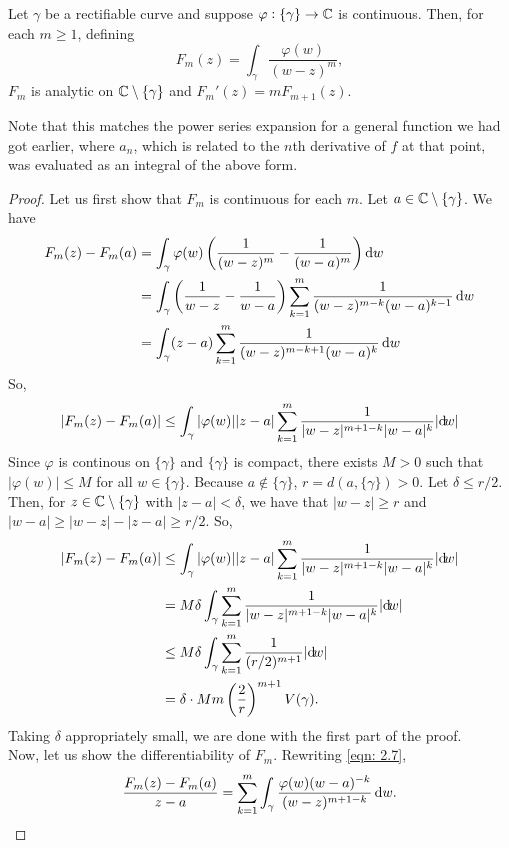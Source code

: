 	\begin{flem}
		\label{lemma 2.31: Fm}
		Let $\gamma$ be a rectifiable curve and suppose $\varphi : \{\gamma\} \to \mathbb{C}$ is continuous. Then, for each $m \ge 1$, defining
		\[ F_m(z) = \int_\gamma \frac{\varphi(w)}{(w-z)^m}, \]
		$F_m$ is analytic on $\mathbb{C}\setminus\{\gamma\}$ and $F_m'(z) = m F_{m+1}(z)$.
	\end{flem}
	Note that this matches the power series expansion for a general function we had got earlier, where $a_n$, which is related to the $n$th derivative of $f$ at that point, was evaluated as an integral of the above form.
	\begin{proof}
		Let us first show that $F_m$ is continuous for each $m$. Let $a \in \mathbb{C}\setminus\{\gamma\}$. We have
		\begin{align}
			F_m(z) - F_m(a) &= \int_\gamma \varphi(w) \left( \frac{1}{(w-z)^m} - \frac{1}{(w-a)^m} \right) \dif w \nonumber \\
				&= \int_\gamma \left( \frac{1}{w-z} - \frac{1}{w-a} \right) \sum_{k=1}^{m} \frac{1}{(w-z)^{m-k} (w-a)^{k-1}} \dif w \nonumber \\
				&= \int_\gamma (z-a) \sum_{k=1}^{m} \frac{1}{(w-z)^{m-k+1} (w-a)^{k}} \dif w \label{eqn: 2.7}
		\end{align}
		So,
		\[ |F_m(z) - F_m(a)| \le \int_\gamma |\varphi(w)| |z-a| \sum_{k=1}^m \frac{1}{|w-z|^{m+1-k}|w-a|^{k}} |{\dif} {w}| \]
		Since $\varphi$ is continous on $\{\gamma\}$ and $\{\gamma\}$ is compact, there exists $M > 0$ such that $|\varphi(w)| \le M$ for all $w \in \{\gamma\}$. Because $a\not\in\{\gamma\}$, $r = d(a,\{\gamma\}) > 0$. Let $\delta \le r/2$. Then, for $z \in \mathbb{C}\setminus\{\gamma\}$ with $|z-a| < \delta$, we have that $|w-z| \ge r$ and $|w-a| \ge |w-z| - |z-a| \ge r/2$. So,
		\begin{align*}
			|F_m(z) - F_m(a)| &\le \int_\gamma |\varphi(w)| |z-a| \sum_{k=1}^m \frac{1}{|w-z|^{m+1-k}|w-a|^{k}} |{\dif} {w}| \\
				&= M\delta \int_\gamma \sum_{k=1}^m \frac{1}{|w-z|^{m+1-k}|w-a|^{k}} |{\dif} {w}| \\
				&\le M\delta \int_\gamma \sum_{k=1}^m \frac{1}{(r/2)^{m+1}} |{\dif}{w}| \\
				&= \delta \cdot Mm \left(\frac{2}{r}\right)^{m+1} V(\gamma).
		\end{align*}
		Taking $\delta$ appropriately small, we are done with the first part of the proof.\\
		Now, let us show the differentiability of $F_m$. Rewriting \eqref{eqn: 2.7},
		\[ \frac{F_m(z) - F_m(a)}{z-a} = \sum_{k=1}^m \int_\gamma \frac{\varphi(w)(w-a)^{-k}}{(w-z)^{m+1-k}} \dif w. \]

\end{proof}

